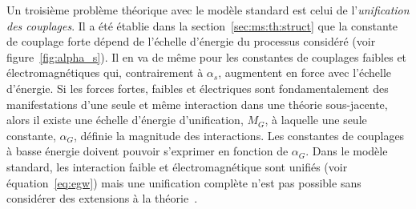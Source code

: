 Un troisième problème théorique avec le modèle standard est celui de
l'\emph{unification des couplages}. Il a été établie dans la
section~\ref{sec:ms:th:struct} que la constante de couplage forte
dépend de l'échelle d'énergie du processus considéré (voir
figure~\ref{fig:alpha_s}). Il en va de même pour les constantes de
couplages faibles et électromagnétiques qui, contrairement à
$\alpha_s$, augmentent en force avec l'échelle d'énergie. Si les
forces fortes, faibles et électriques sont fondamentalement des
manifestations d'une seule et même interaction dans une théorie
sous-jacente, alors il existe une échelle d'énergie d'unification,
$M_G$, à laquelle une seule constante, $\alpha_G$, définie la
magnitude des interactions. Les constantes de couplages à basse
énergie doivent pouvoir s'exprimer en fonction de $\alpha_G$. Dans le
modèle standard, les interaction faible et électromagnétique sont
unifiés (voir équation~\ref{eq:egw}) mais une unification complète
n'est pas possible sans considérer des extensions à la
théorie~\cite{olive_gut_2014,thomson_modern_2013}.


